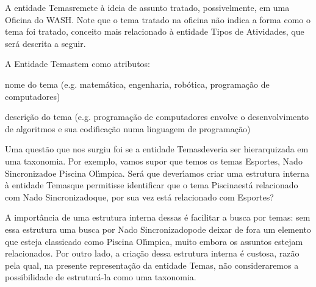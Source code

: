 \documentclass[
12pt,		%
openright,	%
twoside,  %
a4paper,			%
chapter=TITLE,		%
english,			%
french,				%
spanish,			%
brazil				%
]{USPSC-classe/USPSC}
\begin{document}
A entidade \textquotedbl Temas\textquotedbl  remete \`a ideia de assunto tratado, possivelmente, em uma Oficina do WASH. Note que o tema tratado na oficina n\~ao indica a forma como o tema foi tratado, conceito mais relacionado \`a entidade \textquotedbl Tipos de Atividades\textquotedbl , que ser\'a descrita a seguir.









A Entidade \textquotedbl Temas\textquotedbl  tem como atributos:










\begin{alineas}
\item nome do tema (e.g. matem\'atica, engenharia, rob\'otica, programa\c{c}\~ao de computadores)
\item descri\c{c}\~ao do tema (e.g. \textquotedbl programa\c{c}\~ao de computadores envolve o desenvolvimento de algoritmos e sua codifica\c{c}\~ao numa linguagem de programa\c{c}\~ao\textquotedbl )
\end{alineas}

Uma quest\~ao que nos surgiu foi se a entidade \textquotedbl Temas\textquotedbl  deveria ser hierarquizada em uma taxonomia. Por exemplo, vamos supor que temos os temas \textquotedbl Esportes\textquotedbl , \textquotedbl Nado Sincronizado\textquotedbl  e \textquotedbl Piscina Ol\'{\i}mpica\textquotedbl . Ser\'a que dever\'{\i}amos criar uma estrutura interna \`a entidade \textquotedbl Temas\textquotedbl  que permitisse identificar que o tema \textquotedbl Piscina\textquotedbl  est\'a relacionado com \textquotedbl Nado Sincronizado\textquotedbl  que, por sua vez est\'a relacionado com \textquotedbl Esportes\textquotedbl ?









A import\^ancia de uma estrutura interna dessas \'e facilitar a busca por temas: sem essa estrutura uma busca por \textquotedbl Nado Sincronizado\textquotedbl  pode deixar de fora um elemento que esteja classicado como \textquotedbl Piscina Ol\'{\i}mpica\textquotedbl , muito embora os assuntos estejam relacionados. Por outro lado, a cria\c{c}\~ao dessa estrutura interna \'e custosa, raz\~ao pela qual, na presente representa\c{c}\~ao da entidade \textquotedbl Temas\textquotedbl , n\~ao consideraremos a possibilidade de estrutur\'a-la como uma taxonomia.
\end{document}
